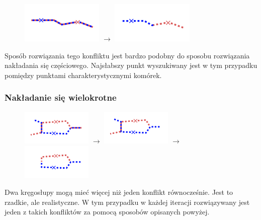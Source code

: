 \documentclass[declaration,shortabstract,mgr]{iithesis}
\begin{document}
\begin{figure}[H]
  \centering
  \includegraphics[valign=m,width=0.35\textwidth]{images/overlap-f.png}
  $\rightarrow$
  \includegraphics[valign=m,width=0.35\textwidth]{images/overlap-f-solved.png}
\end{figure}

Sposób rozwiązania tego konfliktu jest bardzo podobny do sposobu rozwiązania nakładania się częściowego. Najsłabszy punkt wyszukiwany jest w tym przypadku pomiędzy punktami charakterystycznymi komórek.


\subsubsection{Nakładanie się wielokrotne}

\begin{figure}[H]
  \centering
  \includegraphics[valign=m,width=0.3\textwidth]{images/overlap-m.png}
  $\rightarrow$
  \includegraphics[valign=m,width=0.3\textwidth]{images/overlap-m-solved1.png}
  $\rightarrow$
  \includegraphics[valign=m,width=0.3\textwidth]{images/overlap-m-solved2.png}
\end{figure}

Dwa kręgosłupy mogą mieć więcej niż jeden konflikt równocześnie. Jest to rzadkie, ale realistyczne.
W tym przypadku w każdej iteracji rozwiązywany jest jeden z takich konfliktów za pomocą sposobów opisanych powyżej.
\end{document}
